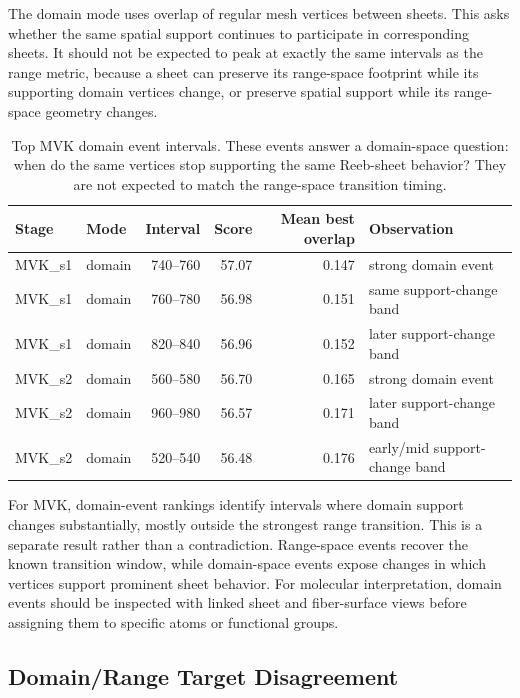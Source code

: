The domain mode uses overlap of regular mesh vertices between sheets. This asks
whether the same spatial support continues to participate in corresponding
sheets. It should not be expected to peak at exactly the same intervals as the
range metric, because a sheet can preserve its range-space footprint while its
supporting domain vertices change, or preserve spatial support while its
range-space geometry changes.

\begin{table}[t]
  \centering
  \caption{Top MVK domain event intervals. These events answer a domain-space
  question: when do the same vertices stop supporting the same Reeb-sheet
  behavior? They are not expected to match the range-space transition timing.}
  \label{tab:mvk-domain-events}
  \begin{tabular}{llrrrl}
    \toprule
    Stage & Mode & Interval & Score & Mean best overlap & Observation \\
    \midrule
    MVK\_s1 & domain & 740--760 & 57.07 & 0.147 &
    strong domain event \\
    MVK\_s1 & domain & 760--780 & 56.98 & 0.151 &
    same support-change band \\
    MVK\_s1 & domain & 820--840 & 56.96 & 0.152 &
    later support-change band \\
    MVK\_s2 & domain & 560--580 & 56.70 & 0.165 &
    strong domain event \\
    MVK\_s2 & domain & 960--980 & 56.57 & 0.171 &
    later support-change band \\
    MVK\_s2 & domain & 520--540 & 56.48 & 0.176 &
    early/mid support-change band \\
    \bottomrule
  \end{tabular}
\end{table}

For MVK, domain-event rankings identify intervals where domain support changes
substantially, mostly outside the strongest range transition. This is a separate
result rather than a contradiction. Range-space events recover the known
transition window, while domain-space events expose changes in which vertices
support prominent sheet behavior. For molecular interpretation, domain events
should be inspected with linked sheet and fiber-surface views before assigning
them to specific atoms or functional groups.

\subsection{Domain/Range Target Disagreement}

